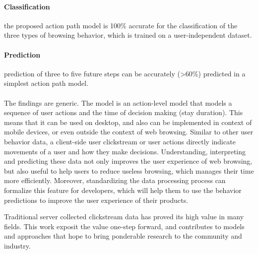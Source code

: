 \paragraph{Classification} the proposed action path model is 100\% accurate for 
the classification of the three types of browsing behavior, which is trained on a user-independent dataset.
\paragraph{Prediction} prediction of three to five future steps can be accurately (>60\%) predicted
in a simplest action path model.

\paragraph{}

The findings are generic. The model is an action-level model that models
a sequence of user actions and the time of decision making (stay duration). This means 
that it can be used on desktop, and also can be implemented in context of mobile devices, 
or even outside the context of web browsing.
Similar to other user behavior data, a client-side user clickstream or user actions 
directly indicate movements of a user and how they make decisions. Understanding, 
interpreting and predicting these data not only improves the user experience of
web browsing, but also useful to help users to reduce useless browsing, which 
manages their time more efficiently. Moreover, standardizing the data processing process 
can formalize this feature for developers, which will help them to use the behavior predictions to
improve the user experience of their products.

Traditional server collected clickstream data has proved its high value in many 
fields. This work exposit the value one-step forward, and contributes to models 
and approaches that hope to bring ponderable research to the community and industry.

\cleardoublepage